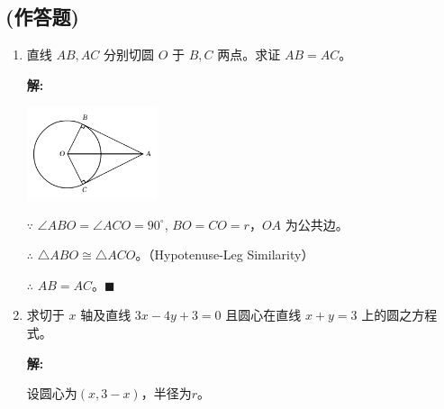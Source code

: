\documentclass[10pt]{article}
\newcommand{\sol}{\textbf{解:} }
\begin{document}
\subsection*{(作答题)}
\begin{enumerate}[leftmargin=*]
  \item 直线 $AB, AC$ 分别切圆 $O$ 于 $B, C$ 两点。求证 $AB=AC$。

        \sol{}
        \begin{center}
          \includegraphics[max width=0.3\textwidth]{./images/tangentLength.png}
        \end{center}

        $\because$ $\angle ABO = \angle ACO = 90^{\circ}$, $BO = CO = r$，$OA$ 为公共边。

        $\therefore$ $\triangle ABO \cong \triangle ACO$。（Hypotenuse-Leg Similarity）

        $\therefore$ $AB = AC$。\hfill$\blacksquare$

  \item 求切于 $x$ 轴及直线 $3 x-4 y+3=0$ 且圆心在直线 $x+y=3$ 上的圆之方程式。

        \sol{}

        设圆心为$(x, 3-x)$，半径为$r$。


\end{enumerate}
\end{document}
